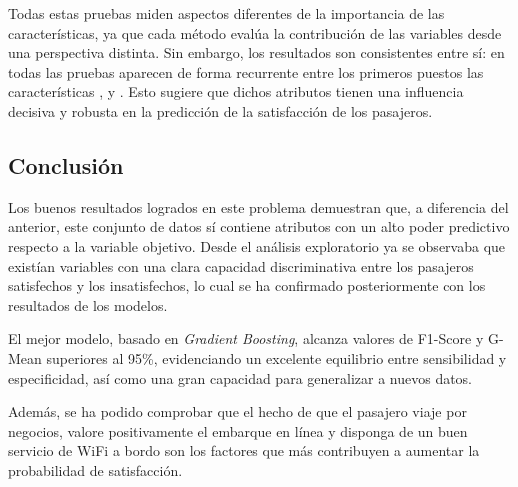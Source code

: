 Todas estas pruebas miden aspectos diferentes de la importancia de las características, ya que cada método evalúa la contribución de las variables desde una perspectiva distinta. Sin embargo, los resultados son consistentes entre sí: en todas las pruebas aparecen de forma recurrente entre los primeros puestos las características ,  y . Esto sugiere que dichos atributos tienen una influencia decisiva y robusta en la predicción de la satisfacción de los pasajeros.


\subsection{Conclusión}

Los buenos resultados logrados en este problema demuestran que, a diferencia del anterior, este conjunto de datos sí contiene atributos con un alto poder predictivo respecto a la variable objetivo. Desde el análisis exploratorio ya se observaba que existían variables con una clara capacidad discriminativa entre los pasajeros satisfechos y los insatisfechos, lo cual se ha confirmado posteriormente con los resultados de los modelos.

El mejor modelo, basado en \textit{Gradient Boosting}, alcanza valores de F1-Score y G-Mean superiores al 95\%, evidenciando un excelente equilibrio entre sensibilidad y especificidad, así como una gran capacidad para generalizar a nuevos datos.

Además, se ha podido comprobar que el hecho de que el pasajero viaje por negocios, valore positivamente el embarque en línea y disponga de un buen servicio de WiFi a bordo son los factores que más contribuyen a aumentar la probabilidad de satisfacción.
